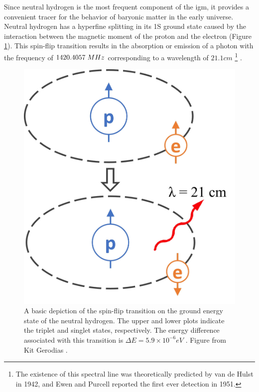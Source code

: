 \documentclass[12pt, TexShade, letterpaper]{report}
\begin{document}
Since neutral hydrogen is the most frequent component of the \gls{igm}, it provides a convenient tracer for the behavior of baryonic matter in the early universe. Neutral hydrogen has a hyperfine splitting in its 1S ground state caused by the interaction between the magnetic moment of the proton and the electron (Figure \ref{fig:spinflip}). This spin-flip transition results in the absorption or emission of a photon with the frequency of $1420.4057\hspace{0.1cm} MHz$\cite{low_frequency} corresponding to a wavelength of $21.1cm$ \footnote{The existence of this spectral line was theoretically predicted by van de Hulst in 1942, and Ewen and Purcell reported the first ever detection in 1951\cite{21century}.} \cite{21century}.\par
\begin{figure}[h!]
\centering
\includegraphics[scale =0.4]{spinflip.jpg}
\caption[Spin-flip Transition of Neutral Hydrogen]{A basic depiction of the spin-flip transition on the ground energy state of the neutral hydrogen. The upper and lower plots indicate the triplet and singlet states, respectively. The energy difference associated with this transition is $\Delta E = 5.9 \times 10 ^{-6}eV$ \cite{21century}. Figure from Kit Gerodias \cite{kit_thesis}.}
\label{fig:spinflip}
\end{figure}
\end{document}
